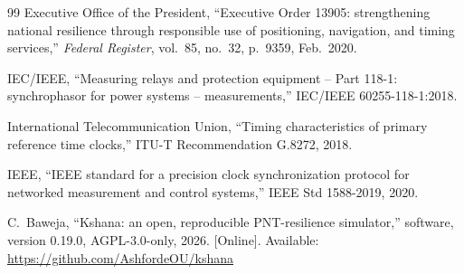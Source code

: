 \documentclass[conference]{IEEEtran}
\begin{document}
\begin{thebibliography}{99}
 Executive Office of the President, ``Executive Order 13905:
strengthening national resilience through responsible use of positioning,
navigation, and timing services,'' \emph{Federal Register}, vol.~85, no.~32,
p.~9359, Feb.~2020.

 IEC/IEEE, ``Measuring relays and protection equipment --
Part 118-1: synchrophasor for power systems -- measurements,''
IEC/IEEE 60255-118-1:2018.

 International Telecommunication Union, ``Timing characteristics of
primary reference time clocks,'' ITU-T Recommendation G.8272, 2018.

 IEEE, ``IEEE standard for a precision clock synchronization protocol
for networked measurement and control systems,'' IEEE Std 1588-2019, 2020.

 C.~Baweja, ``Kshana: an open, reproducible PNT-resilience
simulator,'' software, version 0.19.0, AGPL-3.0-only, 2026. [Online]. Available:
\url{https://github.com/AshfordeOU/kshana}
\end{thebibliography}
\end{document}
